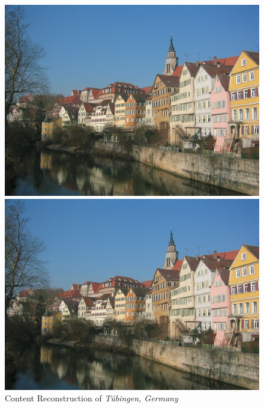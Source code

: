 \documentclass{article}
\begin{document}
\begin{figure}[htp]
\centering
\caption{Content Reconstruction of \textit{T\"{u}bingen, Germany}}
\label{fig:content-reconstruction}

    \begin{minipage}{0.3\linewidth}
    \includegraphics[width=\textwidth]{img/content/block1_conv1}
    \end{minipage}
    \begin{minipage}{0.3\linewidth}
    \includegraphics[width=\textwidth]{img/content/block2_conv1}
    \end{minipage}
    \begin{minipage}{0.3\linewidth}

\end{minipage}
\end{figure}
\end{document}
